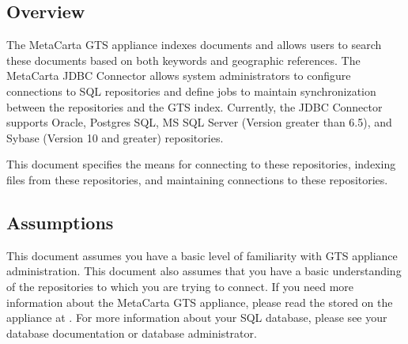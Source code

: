 %
%

\begin{changemargin}{1.5in}{0in}

\section{Overview}

The MetaCarta GTS appliance indexes documents and allows users to
search these documents based on both keywords and geographic
references. The MetaCarta JDBC Connector allows system administrators
to configure connections to SQL repositories and define jobs to
maintain synchronization between the repositories and the GTS
index. Currently, the JDBC Connector supports Oracle, Postgres SQL, MS
SQL Server (Version greater than 6.5), and Sybase (Version 10 and
greater) repositories.

This document specifies the means for connecting to these repositories,
indexing files from these repositories, and maintaining connections to
these repositories.

\subsection{Assumptions}

This document assumes you have a basic level of familiarity with GTS
appliance administration. This document also assumes that you have a
basic understanding of the repositories to which you are trying to
connect. If you need more information about the MetaCarta GTS
appliance, please read the  stored on the appliance at
. For more
information about your SQL database, please see your database
documentation or database administrator.


\end{changemargin}
